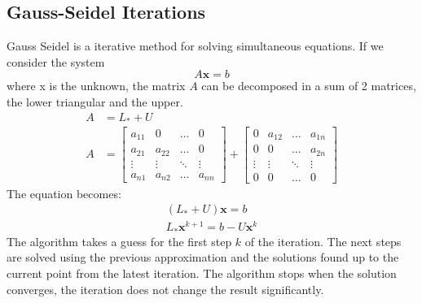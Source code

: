 \documentclass[12pt,a4paper,twoside]{report}
\begin{document}
{\subsection{Gauss-Seidel Iterations} \label{GaussSeidel}
Gauss Seidel is a iterative method for solving simultaneous equations. If we consider the system 
\begin{equation}
A\boldsymbol{x} = b
\end{equation}
where x is the unknown, the matrix $A$ can be decomposed in a sum of 2 matrices, the lower triangular and the upper.
\begin{equation}
	\begin{split}
	A &= L_* +U \\
	A &= \begin{bmatrix}
	a_{11} &  0  & \ldots & 0\\
	a_{21} &  a_{22} & \ldots & 0\\
	\vdots & \vdots & \ddots & \vdots\\
	a_{n1} &  a_{n2}       &\ldots & a_{nn}
	\end{bmatrix}  
	+  \begin{bmatrix}
	0 &  a_{12}  & \ldots & a_{1n}\\
	0 &  0 & \ldots &a_{2n}\\
	\vdots & \vdots & \ddots & \vdots\\
	0 &  0  &\ldots & 0
	\end{bmatrix} 
 	\end{split}
\end{equation}
	The equation becomes:
\begin{equation}
\begin{split}
	(L_*+U)\boldsymbol{x} = b\\
	L_*\boldsymbol{x}^{k+1} = b - U\boldsymbol{x}^{k}
\end{split}
\end{equation}
The algorithm takes a guess for the first step  $k$ of the iteration. The next steps are solved using the previous approximation and the solutions found up to the current point from the latest iteration. The algorithm stops when the solution converges, the iteration does not change the result significantly.

}
\end{document}
